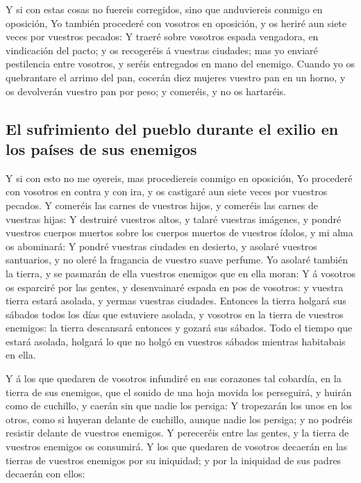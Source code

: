  Y si con estas cosas no fuereis corregidos, sino que
anduviereis conmigo en oposición,  Yo también procederé
con vosotros en oposición, y os heriré aun siete veces por vuestros
pecados:  Y traeré sobre vosotros espada vengadora, en
vindicación del pacto; y os recogeréis á vuestras ciudades; mas yo
enviaré pestilencia entre vosotros, y seréis entregados en mano del
enemigo.  Cuando yo os quebrantare el arrimo del pan,
cocerán diez mujeres vuestro pan en un horno, y os devolverán vuestro
pan por peso; y comeréis, y no os hartaréis.

\hypertarget{el-sufrimiento-del-pueblo-durante-el-exilio-en-los-pauxedses-de-sus-enemigos}{%
\subsection{El sufrimiento del pueblo durante el exilio en los países de
sus
enemigos}\label{el-sufrimiento-del-pueblo-durante-el-exilio-en-los-pauxedses-de-sus-enemigos}}

 Y si con esto no me oyereis, mas procediereis conmigo en
oposición,  Yo procederé con vosotros en contra y con
ira, y os castigaré aun siete veces por vuestros pecados.
 Y comeréis las carnes de vuestros hijos, y comeréis las
carnes de vuestras hijas:  Y destruiré vuestros altos, y
talaré vuestras imágenes, y pondré vuestros cuerpos muertos sobre los
cuerpos muertos de vuestros ídolos, y mi alma os abominará:
 Y pondré vuestras ciudades en desierto, y asolaré
vuestros santuarios, y no oleré la fragancia de vuestro suave perfume.
 Yo asolaré también la tierra, y se pasmarán de ella
vuestros enemigos que en ella moran:  Y á vosotros os
esparciré por las gentes, y desenvainaré espada en pos de vosotros: y
vuestra tierra estará asolada, y yermas vuestras ciudades.
 Entonces la tierra holgará sus sábados todos los días
que estuviere asolada, y vosotros en la tierra de vuestros enemigos: la
tierra descansará entonces y gozará sus sábados.  Todo el
tiempo que estará asolada, holgará lo que no holgó en vuestros sábados
mientras habitabais en ella.

 Y á los que quedaren de vosotros infundiré en sus
corazones tal cobardía, en la tierra de sus enemigos, que el sonido de
una hoja movida los perseguirá, y huirán como de cuchillo, y caerán sin
que nadie los persiga:  Y tropezarán los unos en los
otros, como si huyeran delante de cuchillo, aunque nadie los persiga; y
no podréis resistir delante de vuestros enemigos.  Y
pereceréis entre las gentes, y la tierra de vuestros enemigos os
consumirá.  Y los que quedaren de vosotros decaerán en
las tierras de vuestros enemigos por su iniquidad; y por la iniquidad de
sus padres decaerán con ellos:


